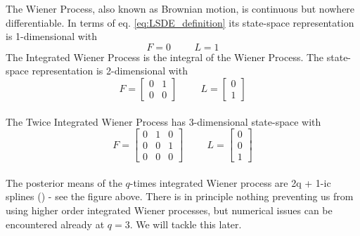 {\begin{center}
        \label{fig:iwps}
    \end{center}
    The Wiener Process, also known as Brownian motion, is continuous but nowhere differentiable. In terms of eq. \ref{eq:LSDE_definition} its state-space representation is 1-dimensional with $$F=0  \hspace{1cm}L=1$$ 
    The Integrated Wiener Process is the integral of the Wiener Process. The state-space representation is 2-dimensional with $$F=\begin{bmatrix}
        0 & 1 \\ 0 & 0
    \end{bmatrix} \hspace{1cm} L=\begin{bmatrix}
        0 \\ 
        1 
    \end{bmatrix}$$
    \\ The Twice Integrated Wiener Process has 3-dimensional state-space with $$F=\begin{bmatrix}
        0 & 1 & 0 \\ 0 & 0 & 1 \\ 0 & 0 & 0
    \end{bmatrix} \hspace{1cm} L=\begin{bmatrix}
        0 \\ 0 \\ 1
    \end{bmatrix}$$
    \\ The posterior means of the $q$-times integrated Wiener process are 2q + 1-ic splines (\cite{probnum}) - see the figure above. There is in principle nothing preventing us from using higher order integrated Wiener processes, but numerical issues can be encountered already at $q=3$. We will tackle this later.
}
\newpage
